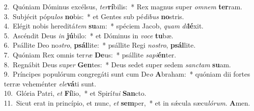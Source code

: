 {2.~}Quóniam Dóminus excélsus, \textit{ter}\textbf{rí}bilis:~* Rex magnus super \textit{om}\textit{nem} \textbf{ter}ram.\\
{3.~}Subjécit pópu\textit{los} \textbf{no}bis:~* et Gentes sub pé\textit{di}\textit{bus} \textbf{no}stris.\\
{4.~}Elégit nobis hereditá\textit{tem} \textbf{su}am:~* spéciem Jacob, \textit{quam} \textit{di}\textbf{lé}xit.\\
{5.~}Ascéndit Deus \textit{in} \textbf{jú}bilo:~* et Dóminus in \textit{vo}\textit{ce} \textbf{tu}bæ.\\
{6.~}Psállite Deo no\textit{stro}, \textbf{psál}lite:~* psállite Regi \textit{no}\textit{stro}, \textbf{psál}lite.\\
{7.~}Quóniam Rex omnis ter\textit{ræ} \textbf{De}us:~* psállite \textit{sa}\textit{pi}\textbf{én}ter.\\
{8.~}Regnábit Deus su\textit{per} \textbf{Gen}tes:~* Deus sedet super sedem \textit{san}\textit{ctam} \textbf{su}am.\\
{9.~}Príncipes populórum congregáti sunt cum De\textit{o} \textbf{A}braham:~* quóniam dii fortes terræ veheménter \textit{e}\textit{le}\textbf{vá}ti sunt.\\
{10.~}Glória Patri, \textit{et} \textbf{Fí}lio,~* et Spirí\textit{tu}\textit{i} \textbf{San}cto.\\
{11.~}Sicut erat in princípio, et nunc, \textit{et} \textbf{sem}per,~* et in sǽcula sæcu\textit{ló}\textit{rum}. \textbf{A}men.\\
